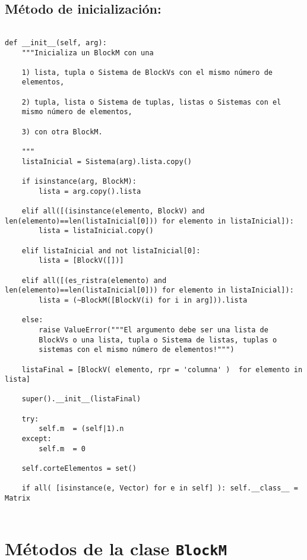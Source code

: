 \documentclass[11pt]{report}
\begin{document}
\subsection{Método de inicialización:}
\label{sec:org9d5db91}

\begin{verbatim}

def __init__(self, arg):
    """Inicializa un BlockM con una

    1) lista, tupla o Sistema de BlockVs con el mismo número de
    elementos,
    
    2) tupla, lista o Sistema de tuplas, listas o Sistemas con el
    mismo número de elementos,
    
    3) con otra BlockM.

    """    
    listaInicial = Sistema(arg).lista.copy()

    if isinstance(arg, BlockM):
        lista = arg.copy().lista
        
    elif all([(isinstance(elemento, BlockV) and len(elemento)==len(listaInicial[0])) for elemento in listaInicial]):
        lista = listaInicial.copy()

    elif listaInicial and not listaInicial[0]:
        lista = [BlockV([])]

    elif all([(es_ristra(elemento) and len(elemento)==len(listaInicial[0])) for elemento in listaInicial]):
        lista = (~BlockM([BlockV(i) for i in arg])).lista
        
    else: 
        raise ValueError("""El argumento debe ser una lista de
        BlockVs o una lista, tupla o Sistema de listas, tuplas o
        sistemas con el mismo número de elementos!""")

    listaFinal = [BlockV( elemento, rpr = 'columna' )  for elemento in lista]

    super().__init__(listaFinal)

    try: 
        self.m  = (self|1).n
    except:
        self.m  = 0
            
    self.corteElementos = set()
           
    if all( [isinstance(e, Vector) for e in self] ): self.__class__ = Matrix
    
\end{verbatim}

\section{Métodos de la clase \texttt{BlockM}}
\label{sec:org4be7dbe}
\end{document}
